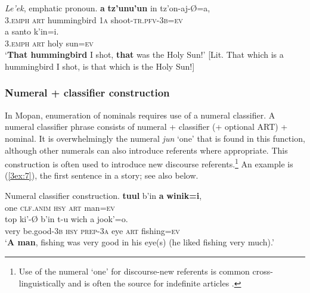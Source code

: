 \documentclass[output=paper]{langsci/langscibook}
\begin{document}
\begin{exe}
\ex\label{3ex:6}
{\emph{Le'ek}}, emphatic pronoun. 
\exi{}
 	{\textbf{a}} 	{\textbf{tz'unu'un}}	 in 		tz'on-aj-\O=a, \\
	{\textsc{3.emph}}	{\textsc{art}}	hummingbird	1{\textsc{a}}	shoot-{\textsc{tr.pfv-3b=ev}} \\
\glt
\exi{}
 	a 	santo	k'in=i.  \\
	3.{\textsc{emph}}	{\textsc{art}}	holy		sun={\textsc{ev}} \\
\glt	`{\textbf{That hummingbird}} I shot, {\textbf{that}} was the Holy Sun!' [Lit. That which is a hummingbird I shot, is that which is the Holy Sun!]
\end{exe}


\subsubsection{Numeral + classifier construction}\label{3sec:213}

In Mopan, enumeration of nominals requires use of a numeral classifier.  A numeral classifier phrase consists of numeral + classifier (+ optional ART) + nominal. %
It is overwhelmingly the numeral {\emph{jun}} `one' that is found in this function,
although other numerals can also introduce referents where appropriate. This construction is often used to introduce new discourse referents.\footnote{Use of the numeral `one' for discourse-new referents is common cross-linguistically and is often the source for indefinite articles \citep[see, e.\,g.,][]{lyons:99}.} An example is (\ref{3ex:7}), the first sentence in a story; see also  below.

\largerpage[2]
\begin{exe}
\ex\label{3ex:7}
Numeral classifier construction. 
\exi{}
 	{\textbf{tuul}} 			b'in 		{\textbf{a}} 	{\textbf{winik=i}}, \\
	one		{\textsc{clf.anim}}	{\textsc{hsy}}		{\textsc{art}}	man{\textsc{=ev}} \\
\glt
\exi{}
\gll	top	ki'-{\O}			b'in		t-u			wich	a		jook'=o. \\
	very	be.good-3{\textsc{b}}	{\textsc{hsy}}	{\textsc{prep-3a}}	eye	{\textsc{art}}	fishing{\textsc{=ev}} \\
\glt 	`{\textbf{A man}}, fishing was very good in his eye(s) (he liked fishing very much).'
\end{exe}
\end{document}
